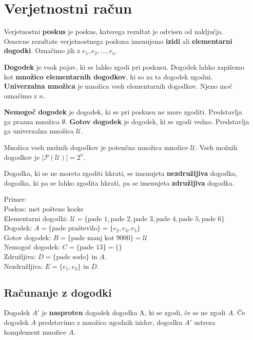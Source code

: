 \documentclass[a4paper,oneside,12pt,fleqn]{article}
\numberwithin{equation}{section}
\begin{document}
\section{Verjetnostni račun}
\label{sec:verj}
Verjetnostni \textbf{poskus} je poskus, katerega rezultat je odvisen od naključja.
Osnovne rezultate verjetnostnega poskusa imenujemo \textbf{izidi} ali \textbf{elementarni
dogodki}. Označimo jih z $e_1, e_2, \dots, e_n$.

\textbf{Dogodek} je vsak pojav, ki se lahko zgodi pri poskusu. Dogodek lahko zapišemo kot
\textbf{množico elementarnih dogodkov}, ki so za ta dogodek ugodni.
\textbf{Univerzalna množica} je množica vseh elementarnih dogodkov. Njeno moč označimo z
$n$.

\textbf{Nemogoč dogodek} je dogodek, ki se pri poskusu ne more zgoditi. Predstavlja ga prazna
množica $\emptyset$.
\textbf{Gotov dogodek} je dogodek, ki se zgodi vedno. Predstavlja ga univerzalna množica
$\mathcal U$.

Množica vseh možnih dogodkov je potenčna množica množice $\mathcal U$. Vseh možnih
dogodkov je $|\mathcal P (\mathcal U)| = 2^n$.

Dogodka, ki se ne moreta zgoditi hkrati, se imenujeta \textbf{nezdružljiva} dogodka, dogodka, ki pa
se lahko zgodita hkrati, pa se imenujeta \textbf{združljiva} dogodka.

Primer:\\
Poskus: met poštene kocke\\
Elementarni dogodki: $\mathcal U = \{\text{pade 1}, \text{pade 2}, \text{pade 3},
\text{pade 4}, \text{pade 5}, \text{pade 6}\}$\\
Dogodek: $A = \{\text{pade praštevilo}\} = \{e_2, e_3, e_5\}$\\
Gotov dogodek: $B = \{\text{pade manj kot 9000}\} = \mathcal U$\\
Nemogoč dogodek: $C = \{\text{pade 13}\} = \{\}$ \\
Združljiva: $D = \{\text{pade sodo}\}$ in $A$. \\
Nezdružljiva: $E = \{e_1, e_3\}$ in $D$. \\

\subsection{Računanje z dogodki}
\label{sec:verj:racdog}
Dogodek $A'$ je \textbf{nasproten} dogodek dogodka A, ki se zgodi, če se ne zgodi $A$.
Če dogodek $A$ predstavimo z množico ugodnih izidov, dogodku $A'$ ustreza komplement
množice $A$.
\end{document}
